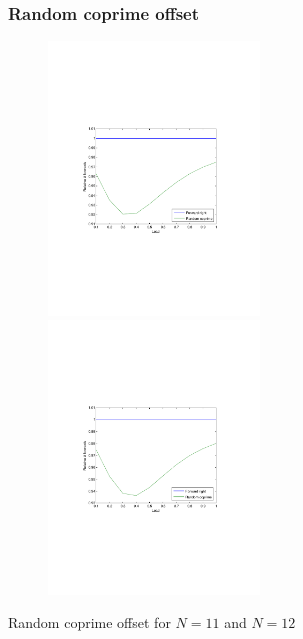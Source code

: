 \documentclass[compress]{beamer}
\begin{document}
\begin{frame}
\frametitle{Random coprime offset}
\begin{figure}
	\includegraphics[clip=true, trim=9em 22em 9em 22em, width=0.5\textwidth]{../resources/plotrandcoprime11.pdf}
	\includegraphics[clip=true, trim=9em 22em 9em 22em, width=0.5\textwidth]{../resources/plotrandcoprime12.pdf}
\end{figure}
\begin{center}
Random coprime offset for $N=11$ and $N=12$
\end{center}
\end{frame}
\end{document}
